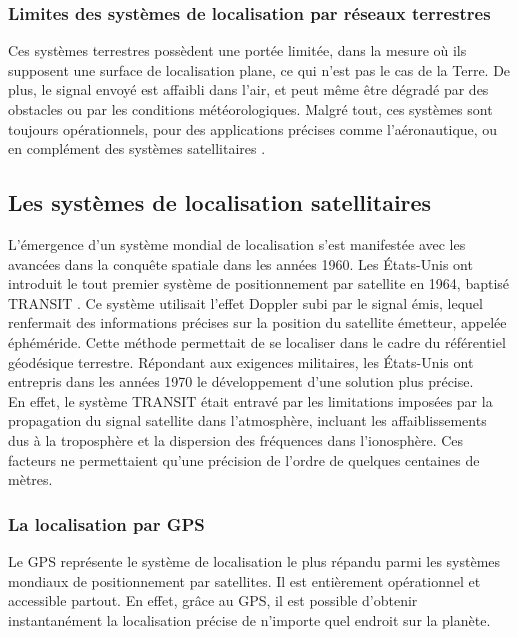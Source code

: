 \subsubsection{Limites des systèmes de localisation par réseaux terrestres }
 
Ces systèmes terrestres possèdent une portée limitée, dans la mesure où ils supposent une surface de localisation plane, ce qui n’est pas le cas de la Terre. De plus, le signal envoyé est affaibli dans l’air, et peut même être dégradé par des obstacles ou par les conditions météorologiques. Malgré tout, ces systèmes sont toujours opérationnels, pour des applications précises comme l’aéronautique, ou en complément des systèmes satellitaires \cite{frederic_evennou_techniques_2007}.

\subsection{ Les systèmes de localisation satellitaires}
L'émergence d'un système mondial de localisation s'est manifestée avec les avancées dans la conquête spatiale dans les années 1960. Les États-Unis ont introduit le tout premier système de positionnement par satellite en 1964, baptisé TRANSIT \cite{w_guier_and_g_weiffenbach_genesis_1997}. Ce système utilisait l'effet Doppler subi par le signal émis, lequel renfermait des informations précises sur la position du satellite émetteur, appelée éphéméride. Cette méthode permettait de se localiser dans le cadre du référentiel géodésique terrestre. Répondant aux exigences militaires, les États-Unis ont entrepris dans les années 1970 le développement d'une solution plus précise. \\

En effet, le système TRANSIT était entravé par les limitations imposées par la propagation du signal satellite dans l'atmosphère, incluant les affaiblissements dus à la troposphère et la dispersion des fréquences dans l'ionosphère. Ces facteurs ne permettaient qu'une précision de l'ordre de quelques centaines de mètres.

\subsubsection{La localisation par GPS}
Le GPS représente le système de localisation le plus répandu parmi les systèmes mondiaux de positionnement par satellites. Il est entièrement opérationnel et accessible partout. En effet, grâce au GPS, il est possible d'obtenir instantanément la localisation précise de n'importe quel endroit sur la planète.

